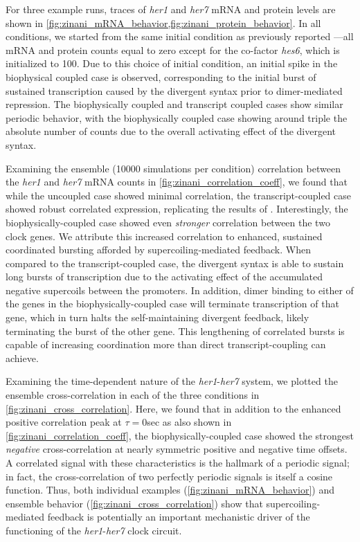 \documentclass[11pt]{article}
\begin{document}
For three example runs, traces of \textit{her1} and \textit{her7} mRNA and protein levels are shown in \cref{fig:zinani_mRNA_behavior,fig:zinani_protein_behavior}. In all conditions, we started from the same initial condition as previously reported \parencite{zinaniPairingSegmentationClock2021}---all mRNA and protein counts equal to zero except for the co-factor \textit{hes6}, which is initialized to 100. Due to this choice of initial condition, an initial spike in the biophysical coupled case is observed, corresponding to the initial burst of sustained transcription caused by the divergent syntax prior to dimer-mediated repression. The biophysically coupled and transcript coupled cases show similar periodic behavior, with the biophysically coupled case showing around triple the absolute number of counts due to the overall activating effect of the divergent syntax.

Examining the ensemble (10000 simulations per condition) correlation between the \textit{her1} and \textit{her7} mRNA counts in \cref{fig:zinani_correlation_coeff}, we found that while the uncoupled case showed minimal correlation, the transcript-coupled case showed robust correlated expression, replicating the results of \parencite{zinaniPairingSegmentationClock2021}. Interestingly, the biophysically-coupled case showed even \emph{stronger} correlation between the two clock genes. We attribute this increased correlation to enhanced, sustained coordinated bursting afforded by supercoiling-mediated feedback. When compared to the transcript-coupled case, the divergent syntax is able to sustain long bursts of transcription due to the activating effect of the accumulated negative supercoils between the promoters. In addition, dimer binding to either of the genes in the biophysically-coupled case will terminate transcription of that gene, which in turn halts the self-maintaining divergent feedback, likely terminating the burst of the other gene. This lengthening of correlated bursts is capable of increasing coordination more than direct transcript-coupling can achieve.

Examining the time-dependent nature of the \textit{her1}-\textit{her7} system, we plotted the ensemble cross-correlation in each of the three conditions in \cref{fig:zinani_cross_correlation}. Here, we found that in addition to the enhanced positive correlation peak at \(\tau = 0\)sec as also shown in \cref{fig:zinani_correlation_coeff}, the biophysically-coupled case showed the strongest \emph{negative} cross-correlation at nearly symmetric positive and negative time offsets. A correlated signal with these characteristics is the hallmark of a periodic signal; in fact, the cross-correlation of two perfectly periodic signals is itself a cosine function. Thus, both individual examples (\cref{fig:zinani_mRNA_behavior}) and ensemble behavior (\cref{fig:zinani_cross_correlation}) show that supercoiling-mediated feedback is potentially an important mechanistic driver of the functioning of the \textit{her1}-\textit{her7} clock circuit.
\end{document}
